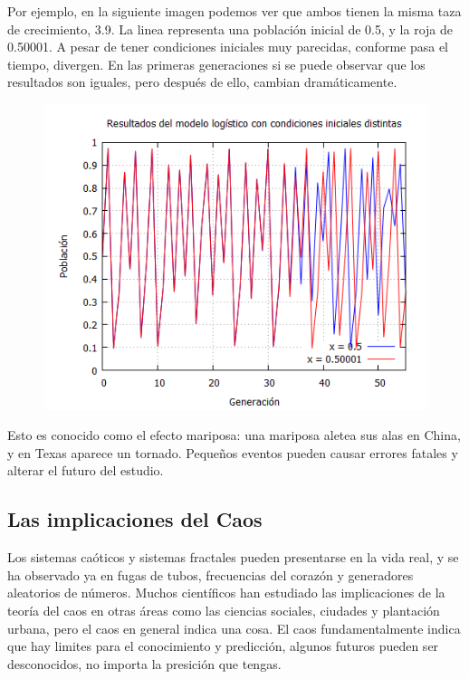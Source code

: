 \documentclass[12pt]{article}
\begin{document}
Por ejemplo, en la siguiente imagen podemos ver que ambos tienen la misma taza de crecimiento, 3.9. La linea representa una población inicial de 0.5, y la roja de 0.50001. A pesar de tener condiciones iniciales muy parecidas, conforme pasa el tiempo, divergen. En las primeras generaciones si se puede observar que los resultados son iguales, pero después de ello, cambian dramáticamente.

\pagebreak

\begin{figure}[h!]
    \centering
\includegraphics[width=5in]{CI.png}
\end{figure}

Esto es conocido como el efecto mariposa: una mariposa aletea sus alas en China, y en Texas aparece un tornado. Pequeños eventos pueden causar errores fatales y alterar el futuro del estudio. 

\subsection{Las implicaciones del Caos}
Los sistemas caóticos y sistemas fractales pueden presentarse en la vida real, y se ha observado ya en fugas de tubos, frecuencias del corazón y generadores aleatorios de números. Muchos científicos han estudiado las implicaciones de la teoría del caos en otras áreas como las ciencias sociales, ciudades y plantación urbana, pero el caos en general indica una cosa. El caos fundamentalmente indica que hay limites para el conocimiento y predicción, algunos futuros pueden ser desconocidos, no importa la presición que tengas. 
\end{document}
